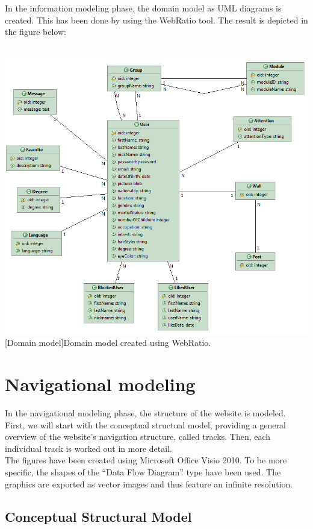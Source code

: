 \documentclass[11pt, a4paper,svglistings,oneside]{book}
\begin{document}
In the information modeling phase, the domain model as UML diagrams is created. This has been done by using the WebRatio tool. The result is depicted in the figure below:
$\;$ \\ \\
\noindent\begin{minipage}{\textwidth}
    \centering
   \includegraphics[scale=0.8]{DomainModel.png}
 [Domain model]{Domain model created using WebRatio.}
\end{minipage}


\clearpage

\section{Navigational modeling}

In the navigational modeling phase, the structure of the website is modeled. First, we will start with the conceptual structual model, providing a general overview of the website's navigation structure, called tracks. Then, each individual track is worked out in more detail. \\
The figures have been created using Microsoft Office Visio 2010. To be more specific, the shapes of the ``Data Flow Diagram'' type have been used. The graphics are exported as vector images and thus feature an infinite resolution.

\subsection{Conceptual Structural Model}
\end{document}
